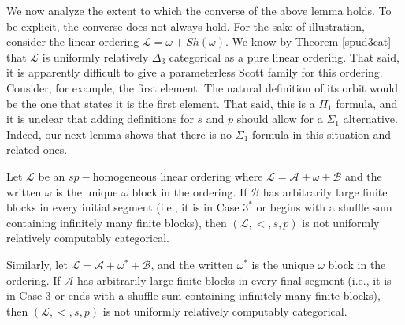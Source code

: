 \documentclass[11pt]{amsart}
\theoremstyle{definition}
\def\A{\mathcal A}
\def\B{\mathcal{B}}
\def\L{\mathcal L}
\begin{document}
We now analyze the extent to which the converse of the above lemma holds.
To be explicit, the converse does not always hold.
For the sake of illustration, consider the linear ordering $\L=\omega+Sh(\omega)$.
We know by Theorem \ref{spud3cat} that $\L$ is uniformly relatively $\Delta_3$ categorical as a pure linear ordering.
That said, it is apparently difficult to give a parameterless Scott family for this ordering.
Consider, for example, the first element.
The natural definition of its orbit would be the one that states it is the first element.
That said, this is a $\Pi_1$ formula, and it is unclear that adding definitions for $s$ and $p$ should allow for a $\Sigma_1$ alternative.
Indeed, our next lemma shows that there is no $\Sigma_1$ formula in this situation and related ones.

\begin{lemma}\label{lem:forbiddensp}
    Let $\L$ be an $sp-$homogeneous linear ordering where $\L=\A+\omega+\B$ and the written $\omega$ is the unique $\omega$ block in the ordering.
    If $\B$ has arbitrarily large finite blocks in every initial segment (i.e., it is in Case $3^*$ or begins with a shuffle sum containing infinitely many finite blocks), then $(\L,<,s,p)$ is not uniformly relatively computably categorical.

    Similarly, let $\L=\A+\omega^*+\B$, and the written $\omega^*$ is the unique $\omega$ block in the ordering.
    If $\A$ has arbitrarily large finite blocks in every final segment (i.e., it is in Case $3$ or ends with a shuffle sum containing infinitely many finite blocks), then $(\L,<,s,p)$ is not uniformly relatively computably categorical.
\end{lemma}
\end{document}
